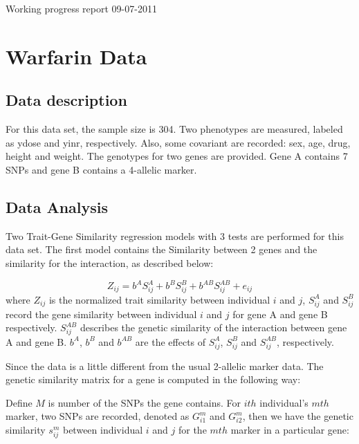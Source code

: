 \documentclass{article}
\begin{document}
    \begin{center}
        \Large{Working progress report 09-07-2011}
    \end{center}

    \fontsize{11pt}{\baselineskip}\selectfont

    \section{Warfarin Data}

    \subsection{Data description}

        For this data set, the sample size is 304. Two phenotypes are measured, labeled as ydose and yinr, respectively. Also, some covariant are recorded: sex, age, drug, height and weight. The genotypes for two genes are provided. Gene A contains 7 SNPs and gene B contains a 4-allelic marker.

    \subsection{Data Analysis}

        Two Trait-Gene Similarity regression models with 3 tests are performed for this data set. The first model contains the Similarity between 2 genes and the similarity for the interaction, as described below:

        \begin{equation*}
            Z_{ij}=b^AS_{ij}^A+b^BS_{ij}^B+b^{AB}S_{ij}^{AB}+e_{ij}
        \end{equation*}
        where $Z_{ij}$ is the normalized trait similarity between individual $i$ and $j$, $S^A_{ij}$ and $S^B_{ij}$ record the gene similarity between individual $i$ and $j$ for gene A and gene B respectively. $S^{AB}_{ij}$ describes the genetic similarity of the interaction between gene A and gene B. $b^A$, $b^B$ and $b^{AB}$ are the effects of $S^A_{ij}$, $S^B_{ij}$ and $S^{AB}_{ij}$, respectively.

        Since the data is a little different from the usual 2-allelic marker data. The genetic similarity matrix for a gene is computed in the following way:

        Define $M$ is number of the SNPs the gene contains. For $ith$ individual's $mth$ marker, two SNPs are recorded, denoted as $G_{i1}^m$ and $G_{i2}^m$, then we have the genetic similarity $s_{ij}^m$ between individual $i$ and $j$ for the $mth$ marker in a particular gene:
\end{document}
